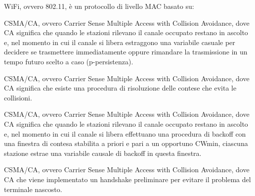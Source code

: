 \question[1]
WiFi, ovvero 802.11, è un protocollo di livello MAC basato su:

\begin{checkboxes}
	\choice CSMA/CA, ovvero Carrier Sense Multiple Access with Collision Avoidance, dove CA significa che quando le stazioni rilevano il canale occupato restano in ascolto e, nel momento in cui il canale si libera estraggono una variabile casuale per decidere se trasmettere immediatamente oppure rimandare la trasmissione in un tempo futuro scelto a caso (p-persistenza).

	\choice CSMA/CA, ovvero Carrier Sense Multiple Access with Collision Avoidance, dove CA significa che esiste una procedura di risoluzione delle contese che evita le collisioni.

	\CorrectChoice CSMA/CA, ovvero Carrier Sense Multiple Access with Collision Avoidance, dove CA significa che quando le stazioni rilevano il canale occupato restano in ascolto e, nel momento in cui il canale si libera effettuano una procedura di backoff con una finestra di contesa stabilita a priori e pari a un opportuno CWmin, ciascuna stazione estrae una variabile causale di backoff in questa finestra.

	\choice CSMA/CA, ovvero Carrier Sense Multiple Access with Collision Avoidance, dove CA che viene implementato un handshake preliminare per evitare il problema del terminale nascosto.
\end{checkboxes}
